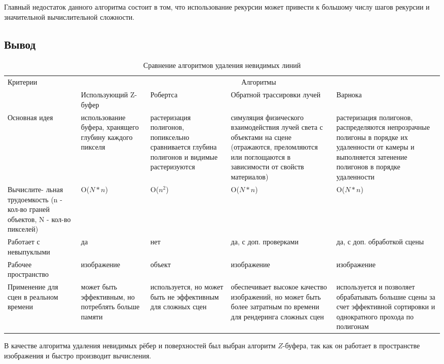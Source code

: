 Главный недостаток данного алгоритма состоит в том, что использование рекурсии может привести к большому числу шагов рекурсии и значительной вычислительной сложности.


\subsection*{Вывод}

\begin{table} [] 
	\caption{Сравнение алгоритмов удаления невидимых линий}
	\label{tbl:alg_del}
	\begin{tabular}{|p{}|p{}|p{}|p{}|p{}|}
		\hline
		\multirow{2}{*}{Критерии} & \multicolumn{4}{|c|}{Алгоритмы} \\
		\cline{2-5}
		& Использующий Z-буфер & Робертса & Обратной трассировки лучей & Варнока  \\
		\hline
		Основная идея & использование буфера, хранящего глубину каждого пикселя & растеризация полигонов, попиксельно сравнивается глубина полигонов и видимые растеризуются & симуляция физического взаимодействия лучей света с объектами на сцене (отражаются, преломляются или поглощаются в зависимости от свойств материалов) & растеризация полигонов, распределяются непрозрачные полигоны в порядке их удаленности от камеры и выполняется затенение полигонов в порядке удаленности \\
		\hline
		Вычислите-
		льная трудоемкость (n - кол-во граней объектов, N - кол-во пикселей)& O($N*n$) & O($n^2$) &  O($N*n$) & O($N*n$) \\		
		\hline
		Работает с невыпуклыми & да & нет & да, с доп. проверками & да, с доп. обработкой сцены\\
		\hline
		Рабочее пространство & изображение & объект & изображение & изображение \\ 
		\hline 
		Применение для сцен в реальном времени & может быть эффективным, но потреблять больше памяти & используется, но может быть не эффективным для сложных сцен & обеспечивает высокое качество изображений, но может быть более затратным по времени для рендеринга сложных сцен & используется и позволяет обрабатывать большие сцены за счет эффективной сортировки и однократного прохода по полигонам \\
		\hline
	\end{tabular}
\end{table}


В качестве алгоритма удаления невидимых рёбер и поверхностей был выбран алгоритм $Z$-буфера, так как он работает в пространстве изображения и быстро производит вычисления.

